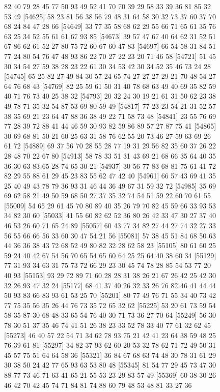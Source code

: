 \documentclass{article}
\begin{document}
\begin{figure}[H]
\begin{Schunk}
\begin{Soutput}
[54601] 82 40 79 28 45 77 50 93 49 52 41 70 70 39 29 58 33 39 36 81 85 32 53 49
[54625] 58 23 81 56 38 56 79 48 31 64 58 30 32 73 37 60 37 70 68 24 84 47 28 66
[54649] 33 77 35 58 68 62 29 55 66 71 65 61 35 76 63 25 34 52 55 61 61 67 93 85
[54673] 39 57 47 67 40 64 62 31 52 51 67 86 62 61 52 27 80 75 72 60 67 60 47 83
[54697] 66 54 58 31 84 51 77 24 80 54 76 47 48 93 86 22 70 27 22 23 20 71 46 58
[54721] 51 45 30 34 54 27 59 38 28 23 22 61 30 34 53 42 30 34 52 35 46 73 24 28
[54745] 65 25 82 27 49 84 30 57 24 65 74 27 27 27 29 21 70 48 54 27 64 76 68 43
[54769] 82 25 59 61 50 31 40 78 68 63 49 40 69 35 82 59 40 71 76 73 40 25 38 32
[54793] 20 32 24 30 19 21 61 31 50 62 23 38 49 78 71 35 32 54 87 53 69 80 59 49
[54817] 77 23 23 54 21 31 52 57 38 35 69 21 23 64 47 88 36 38 49 22 71 58 73 48
[54841] 23 55 76 69 77 28 39 72 88 41 44 46 59 30 93 82 59 86 89 57 27 87 75 41
[54865] 30 69 68 81 50 21 60 25 63 31 58 76 62 55 20 73 46 27 59 63 69 26 61 72
[54889] 69 37 56 70 28 55 28 77 19 31 29 56 82 35 60 37 26 22 28 48 70 22 67 80
[54913] 58 78 33 51 31 43 69 21 68 66 35 64 40 35 36 30 63 83 65 28 74 65 30 21
[54937] 30 56 77 83 68 81 75 61 41 72 82 29 55 88 61 29 45 23 83 55 62 47 42 40
[54961] 66 57 43 69 41 35 25 40 49 43 78 79 36 93 31 46 44 36 49 67 31 59 32 72
[54985] 35 69 69 62 58 21 49 50 59 68 50 27 37 35 32 74 54 51 59 22 60 70 61 55
[55009] 54 65 29 61 45 70 80 89 40 35 26 79 70 82 45 59 66 33 93 53 34 82 30 60
[55033] 41 55 60 82 62 52 36 80 26 42 33 47 30 27 37 40 46 53 26 60 71 65 24 89
[55057] 60 43 77 34 82 27 44 27 74 32 27 33 56 55 66 66 56 33 60 30 47 54 21 56
[55081] 57 38 45 51 84 68 50 63 44 36 36 38 43 72 68 52 49 80 82 32 28 62 58 23
[55105] 80 61 60 25 59 24 40 42 67 54 56 70 65 54 65 60 64 25 25 64 40 38 60 34
[55129] 77 31 93 34 63 31 75 73 72 66 29 23 30 45 74 78 28 85 54 53 77 20 40 93
[55153] 93 29 72 89 71 60 28 28 31 38 26 21 67 26 42 25 42 30 32 26 93 47 32 24
[55177] 68 41 37 40 26 32 33 26 76 82 46 41 44 44 50 93 83 66 83 93 61 53 25 70
[55201] 80 77 49 76 71 55 34 40 73 42 77 75 35 56 35 26 44 76 73 35 72 65 32 62
[55225] 53 20 61 73 59 54 58 35 87 30 68 48 33 65 54 76 40 30 71 73 36 27 70 64
[55249] 56 30 78 30 51 37 35 46 74 41 51 26 38 23 33 52 78 33 40 77 61 32 62 45
[55273] 46 40 57 22 54 71 34 62 78 93 75 21 42 41 23 64 38 59 48 25 76 39 61 81
[55297] 34 82 37 93 62 60 20 53 32 78 62 71 72 49 50 31 45 57 75 51 64 64 58 36
[55321] 36 84 67 68 63 74 48 30 78 31 61 29 30 38 50 24 42 77 65 93 63 53 80 48
[55345] 81 54 77 29 45 73 47 30 88 77 73 46 71 63 41 65 21 55 53 23 29 83 57 49
[55369] 60 38 30 26 46 42 70 42 45 74 71 84 81 74 88 60 79 48 53 48 81 33 27 36

\end{Soutput}
\end{Schunk}
\end{figure}
\end{document}

